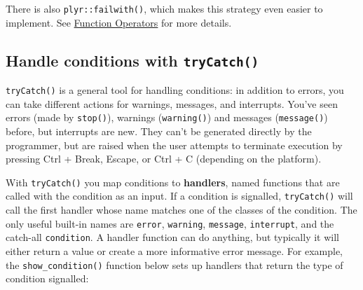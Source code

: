 There is also \texttt{plyr::failwith()}, which makes this strategy even
easier to implement. See \hyperref[output-fos]{Function Operators} for
more details.

\subsection{Handle conditions with \texttt{tryCatch()}}

\texttt{tryCatch()} is a general tool for handling conditions: in
addition to errors, you can take different actions for warnings,
messages, and interrupts. You've seen errors (made by \texttt{stop()}),
warnings (\texttt{warning()}) and messages (\texttt{message()}) before,
but interrupts are new. They can't be generated directly by the
programmer, but are raised when the user attempts to terminate execution
by pressing Ctrl + Break, Escape, or Ctrl + C (depending on the
platform).  

With \texttt{tryCatch()} you map conditions to \textbf{handlers}, named
functions that are called with the condition as an input. If a condition
is signalled, \texttt{tryCatch()} will call the first handler whose name
matches one of the classes of the condition. The only useful built-in
names are \texttt{error}, \texttt{warning}, \texttt{message},
\texttt{interrupt}, and the catch-all \texttt{condition}. A handler
function can do anything, but typically it will either return a value or
create a more informative error message. For example, the
\texttt{show\_condition()} function below sets up handlers that return
the type of condition signalled: 

\begin{Shaded}
\begin{Highlighting}[]
\StringTok{ }
     \NormalTok{,}
     \NormalTok{,}
     
  \NormalTok{)}
\NormalTok{\}}
\NormalTok{(}\NormalTok{(}\NormalTok{))}
\NormalTok{(}\NormalTok{(}\NormalTok{))}
\NormalTok{(}\NormalTok{(}\NormalTok{))}

\NormalTok{(}\NormalTok{)}
\end{Highlighting}
\end{Shaded}


